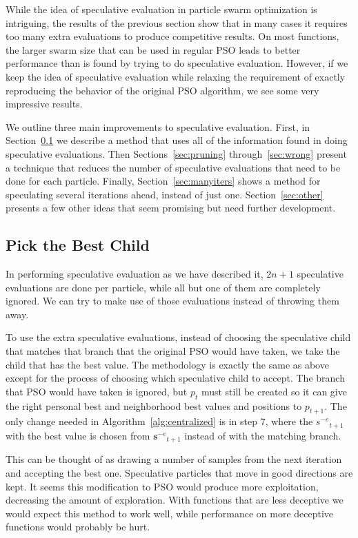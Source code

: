 \documentclass[journal,letterpaper]{IEEEtran}
\renewcommand{\sec}[1]{Section~\ref{sec:#1}}
\newcommand{\alg}[1]{Algorithm~\ref{alg:#1}}
\providecommand{\noeval}[1]{\ensuremath{#1^{-e}}}
\providecommand{\p}{\ensuremath{p}}
\providecommand{\s}{\ensuremath{s}}
\providecommand{\sset}{\ensuremath{\mathbf{s}}}
\begin{document}
While the idea of speculative evaluation in particle swarm optimization is
intriguing, the results of the previous section show that in many cases it
requires too many extra evaluations to produce competitive results.  On most
functions, the larger swarm size that can be used in regular PSO leads to
better performance than is found by trying to do speculative evaluation.
However, if we keep the idea of speculative evaluation while relaxing the
requirement of exactly reproducing the behavior of the original PSO algorithm,
we see some very impressive results.

We outline three main improvements to speculative evaluation.  First, in
\sec{pickbest} we describe a method that uses all of the information found in
doing speculative evaluations.  Then Sections~\ref{sec:pruning}
through~\ref{sec:wrong} present a technique that reduces the number of
speculative evaluations that need to be done for each particle.  Finally,
\sec{manyiters} shows a method for speculating several iterations ahead,
instead of just one.  \sec{other} presents a few other ideas that seem
promising but need further development.

\subsection{Pick the Best Child}
\label{sec:pickbest}

In performing speculative evaluation as we have described it, $2n+1$
speculative evaluations are done per particle, while all but one of them are
completely ignored.  We can try to make use of those evaluations instead of
throwing them away.  

To use the extra speculative evaluations, instead of choosing the speculative
child that matches that branch that the original PSO would have taken, we take
the child that has the best value.  The methodology is exactly the same as
above except for the process of choosing which speculative child to accept.
The branch that PSO would have taken is ignored, but $\p_t$ must still be
created so it can give the right personal best and neighborhood best values and
positions to $\p_{t+1}$.  The only change needed in \alg{centralized} is in
step 7, where the $\noeval{\s}_{t+1}$ with the best value is chosen from
$\noeval{\sset}_{t+1}$ instead of with the matching branch.

This can be thought of as drawing a number of samples from the next iteration
and accepting the best one.  Speculative particles that move in good directions
are kept.  It seems this modification to PSO would produce more exploitation,
decreasing the amount of exploration.  With functions that are less deceptive
we would expect this method to work well, while performance on more deceptive
functions would probably be hurt.
\end{document}
